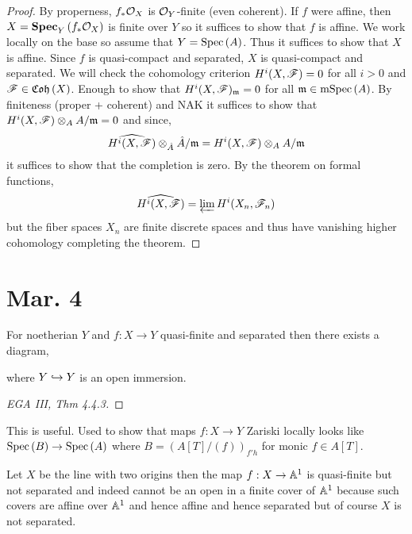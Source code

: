 \documentclass[12pt]{article}
\begin{document}
\begin{proof}
By properness, $f_* \mathcal{O}_{X}$ is $\mathcal{O}_{Y}$-finite (even coherent). If $f$ were affine, then $X = \mathbf{Spec}_{Y}\left( f_* \mathcal{O}_{X} \right)$ is finite over $Y$ so it suffices to show that $f$ is affine. We work locally on the base so assume that $Y = \mathrm{Spec}\left( A \right)$. Thus it suffices to show that $X$ is affine. Since $f$ is quasi-compact and separated, $X$ is quasi-compact and separated. We will check the cohomology criterion $H^i(X, \mathscr{F}) = 0$ for all $i > 0$ and $\mathscr{F} \in \mathfrak{Coh}\left(X\right)$. Enough to show that $H^i(X, \mathscr{F})_{\mathfrak{m}} = 0$ for all $\mathfrak{m} \in \mathrm{mSpec}\left( A \right)$. By finiteness (proper + coherent) and NAK it suffices to show that $H^i(X, \mathscr{F}) \otimes_A A / \mathfrak{m} = 0$ and since,
\[ \widehat{H^i(X, \mathscr{F})} \otimes_{\hat{A}} \hat{A} / \mathfrak{m} = H^i(X, \mathscr{F}) \otimes_A A / \mathfrak{m} \]
it suffices to show that the completion is zero. By the theorem on formal functions,
\[ \widehat{H^i(X, \mathscr{F})} = \varprojlim H^i(X_n, \mathscr{F}_n) \]
but the fiber spaces $X_n$ are finite discrete spaces and thus have vanishing higher cohomology completing the theorem.
\end{proof}

\section{Mar. 4}

\begin{thm}
For noetherian $Y$ and $f : X \to Y$ quasi-finite and separated then there exists a diagram,
\begin{center}
\end{center}
where $Y \hookrightarrow Y$ is an open immersion.
\end{thm}

\begin{proof}
[EGA III, Thm 4.4.3]
\end{proof}

\begin{rmk}
This is useful. Used to show that \etale maps $f : X \to Y$ Zariski locally looks like $\mathrm{Spec}\left( B \right) \to \mathrm{Spec}\left( A \right)$ where $B = (A[T]/(f))_{f'h}$ for monic $f \in A[T]$.
\end{rmk}

\begin{rmk}
Let $X$ be the line with two origins then the map $f : X \to \mathbb{A}^1$ is quasi-finite but not separated and indeed cannot be an open in a finite cover of $\mathbb{A}^1$ because such covers are affine over $\mathbb{A}^1$ and hence affine and hence separated but of course $X$ is not separated. 
\end{rmk}
\end{document}
